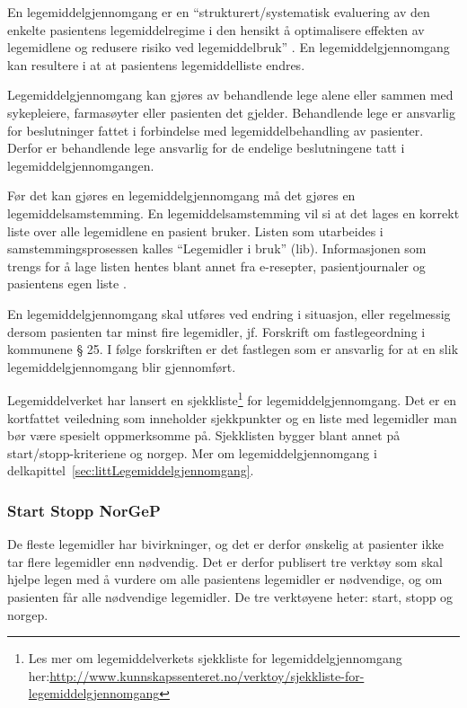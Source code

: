 En legemiddelgjennomgang er en “strukturert/systematisk evaluering av den enkelte pasientens legemiddelregime i den hensikt å optimalisere effekten av legemidlene og redusere risiko ved legemiddelbruk” \citep{legemiddelgjennomgang}. En legemiddelgjennomgang kan resultere i at at pasientens legemiddelliste endres.

Legemiddelgjennomgang kan gjøres av behandlende lege alene eller sammen med sykepleiere, farmasøyter eller pasienten det gjelder. Behandlende lege er ansvarlig for beslutninger fattet i forbindelse med legemiddelbehandling av pasienter. Derfor er behandlende lege ansvarlig for de endelige beslutningene tatt i legemiddelgjennomgangen.

Før det kan gjøres en legemiddelgjennomgang må det gjøres en legemiddelsamstemming. En legemiddelsamstemming vil si at det lages en korrekt liste over alle legemidlene en pasient bruker. Listen som utarbeides i samstemmingsprosessen kalles “Legemidler i bruk” (\acrshort{lib}). Informasjonen som trengs for å lage listen hentes blant annet fra e-resepter, pasientjournaler og pasientens egen liste \citep{sjekklisteLegemiddelgjennomgang}.
 
En legemiddelgjennomgang skal utføres ved endring i situasjon, eller regelmessig dersom pasienten tar minst fire legemidler, jf. Forskrift om fastlegeordning i kommunene § 25. I følge forskriften er det fastlegen som er ansvarlig for at en slik legemiddelgjennomgang blir gjennomført.
 
Legemiddelverket har lansert en sjekkliste\footnote{Les mer om legemiddelverkets sjekkliste for legemiddelgjennomgang her:\url{http://www.kunnskapssenteret.no/verktoy/sjekkliste-for-legemiddelgjennomgang}} for legemiddelgjennomgang. Det er en kortfattet veiledning som inneholder sjekkpunkter og en liste med legemidler man bør være spesielt oppmerksomme på. Sjekklisten bygger blant annet på \acrshort{start}/\acrshort{stopp}-kriteriene og \acrshort{norgep}. Mer om legemiddelgjennomgang i delkapittel~\ref{sec:littLegemiddelgjennomgang}.

\subsubsection{Start Stopp NorGeP}
De fleste legemidler har bivirkninger, og det er derfor ønskelig at pasienter ikke tar flere legemidler enn nødvendig. Det er derfor publisert tre verktøy som skal hjelpe legen med å vurdere om alle pasientens legemidler er nødvendige, og om pasienten får alle nødvendige legemidler. De tre verktøyene heter: \acrshort{start}, \acrshort{stopp} og \acrshort{norgep}. 

